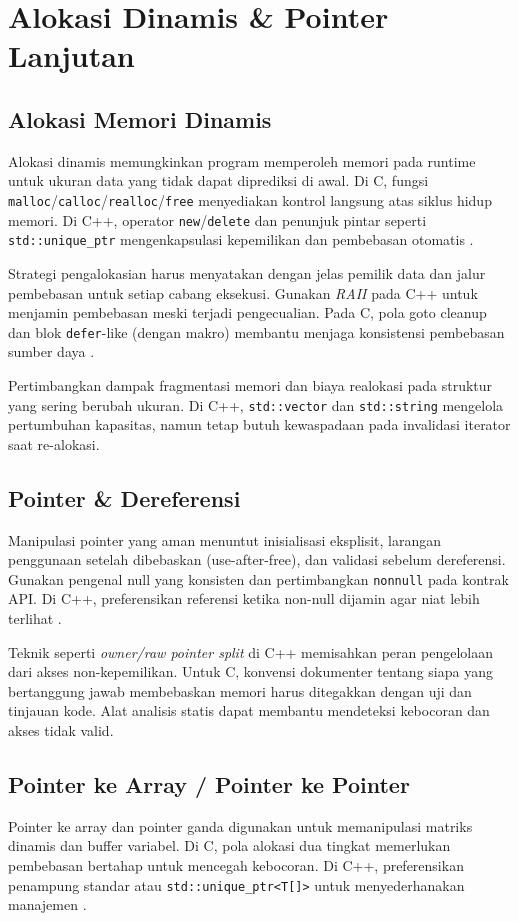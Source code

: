 \documentclass[../main.tex]{subfiles}
\begin{document}
\chapter{Alokasi Dinamis \& Pointer Lanjutan}
\section{Alokasi Memori Dinamis}
Alokasi dinamis memungkinkan program memperoleh memori pada runtime untuk ukuran data yang tidak dapat diprediksi di awal. Di C, fungsi \texttt{malloc}/\texttt{calloc}/\texttt{realloc}/\texttt{free} menyediakan kontrol langsung atas siklus hidup memori. Di C++, operator \texttt{new}/\texttt{delete} dan penunjuk pintar seperti \texttt{std::unique_ptr} mengenkapsulasi kepemilikan dan pembebasan otomatis \parencite{iso-c-draft-n1570,cpp-reference}.

Strategi pengalokasian harus menyatakan dengan jelas pemilik data dan jalur pembebasan untuk setiap cabang eksekusi. Gunakan \emph{RAII} pada C++ untuk menjamin pembebasan meski terjadi pengecualian. Pada C, pola goto cleanup dan blok \texttt{defer}-like (dengan makro) membantu menjaga konsistensi pembebasan sumber daya \parencite{gnu-c-manual}.

Pertimbangkan dampak fragmentasi memori dan biaya realokasi pada struktur yang sering berubah ukuran. Di C++, \texttt{std::vector} dan \texttt{std::string} mengelola pertumbuhan kapasitas, namun tetap butuh kewaspadaan pada invalidasi iterator saat re-alokasi.

\section{Pointer \& Dereferensi}
Manipulasi pointer yang aman menuntut inisialisasi eksplisit, larangan penggunaan setelah dibebaskan (use-after-free), dan validasi sebelum dereferensi. Gunakan pengenal null yang konsisten dan pertimbangkan \texttt{nonnull} pada kontrak API. Di C++, preferensikan referensi ketika non-null dijamin agar niat lebih terlihat \parencite{gnu-c-manual,cpp-reference}.

Teknik seperti \emph{owner/raw pointer split} di C++ memisahkan peran pengelolaan dari akses non-kepemilikan. Untuk C, konvensi dokumenter tentang siapa yang bertanggung jawab membebaskan memori harus ditegakkan dengan uji dan tinjauan kode. Alat analisis statis dapat membantu mendeteksi kebocoran dan akses tidak valid.

\section{Pointer ke Array / Pointer ke Pointer}
Pointer ke array dan pointer ganda digunakan untuk memanipulasi matriks dinamis dan buffer variabel. Di C, pola alokasi dua tingkat memerlukan pembebasan bertahap untuk mencegah kebocoran. Di C++, preferensikan penampung standar atau \texttt{std::unique_ptr<T[]>} untuk menyederhanakan manajemen \parencite{iso-c-draft-n1570,cpp-reference}.
\end{document}
